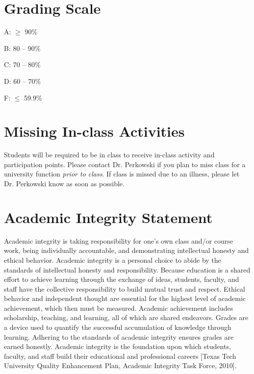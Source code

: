 \documentclass[12pt, notitlepage]{article}   	%
\begin{document}
{\section{Grading Scale}
A: $\geq$ 90\% \par
B: 80 – 90\% \par
C: 70 – 80\% \par
D: 60 – 70\% \par
F: $\leq$ 59.9\% \par

\section{Missing In-class Activities}
Students will be required to be in class to receive in-class activity and participation points. Please contact Dr. Perkowski if you plan to miss class for a university function \textit{prior to class}. If class is missed due to an illness, please let Dr. Perkowski know as soon as possible.

\section{Academic Integrity Statement}
Academic integrity is taking responsibility for one’s own class and/or course work, being individually accountable, and demonstrating intellectual honesty and ethical behavior. Academic integrity is a personal choice to abide by the standards of intellectual honesty and responsibility. Because education is a shared effort to achieve learning through the exchange of ideas, students, faculty, and staff have the collective responsibility to build mutual trust and respect. Ethical behavior and independent thought are essential for the highest level of academic achievement, which then must be measured. Academic achievement includes scholarship, teaching, and learning, all of which are shared endeavors. Grades are a device used to quantify the successful accumulation of knowledge through learning. Adhering to the standards of academic integrity ensures grades are earned honestly. Academic integrity is the foundation upon which students, faculty, and staff build their educational and professional careers [Texas Tech University Quality Enhancement Plan, Academic Integrity Task Force, 2010].

}
\end{document}
